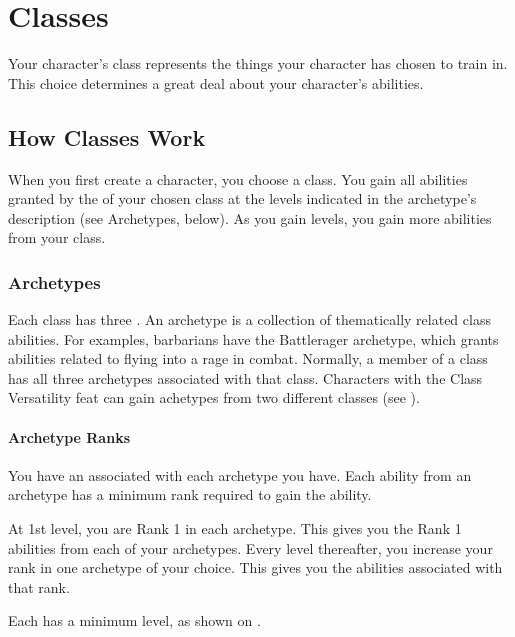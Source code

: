 \chapter{Classes}\label{Classes}

Your character's class represents the things your character has chosen to train in.
This choice determines a great deal about your character's abilities.

\section{How Classes Work}
    When you first create a character, you choose a class.
    You gain all abilities granted by the  of your chosen class at the levels indicated in the archetype's description (see Archetypes, below).
    As you gain levels, you gain more abilities from your class.

    \subsection{Archetypes}\label{Archetypes}
        Each class has three .
        An archetype is a collection of thematically related class abilities.
        For examples, barbarians have the Battlerager archetype, which grants abilities related to flying into a rage in combat.
        Normally, a member of a class has all three archetypes associated with that class.
        Characters with the Class Versatility feat can gain achetypes from two different classes (see ).

        \subsubsection{Archetype Ranks}\label{Archetype Ranks}
            You have an  associated with each archetype you have.
            Each ability from an archetype has a minimum rank required to gain the ability.

            At 1st level, you are Rank 1 in each archetype.
            This gives you the Rank 1 abilities from each of your archetypes.
            Every level thereafter, you increase your rank in one archetype of your choice.
            This gives you the abilities associated with that rank.

            Each  has a minimum level, as shown on .

